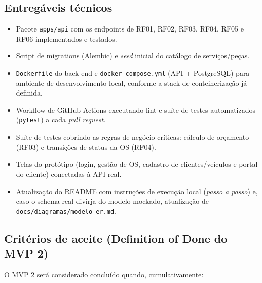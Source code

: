 \documentclass[11pt, a4paper]{article}
\begin{document}
\subsection{Entregáveis técnicos}

\begin{itemize}
    \item Pacote \texttt{apps/api} com os endpoints de RF01, RF02, RF03, RF04, RF05 e RF06 implementados e testados.
    \item Script de migrations (Alembic) e \emph{seed} inicial do catálogo de serviços/peças.
    \item \texttt{Dockerfile} do back-end e \texttt{docker-compose.yml} (API + PostgreSQL) para ambiente de desenvolvimento local, conforme a stack de conteinerização já definida.
    \item Workflow de GitHub Actions executando lint e suíte de testes automatizados (\texttt{pytest}) a cada \emph{pull request}.
    \item Suíte de testes cobrindo as regras de negócio críticas: cálculo de orçamento (RF03) e transições de status da OS (RF04).
    \item Telas do protótipo (login, gestão de OS, cadastro de clientes/veículos e portal do cliente) conectadas à API real.
    \item Atualização do README com instruções de execução local (\emph{passo a passo}) e, caso o schema real divirja do modelo mockado, atualização de \texttt{docs/diagramas/modelo-er.md}.
\end{itemize}

\subsection{Critérios de aceite (Definition of Done do MVP 2)}

O MVP 2 será considerado concluído quando, cumulativamente:
\end{document}
